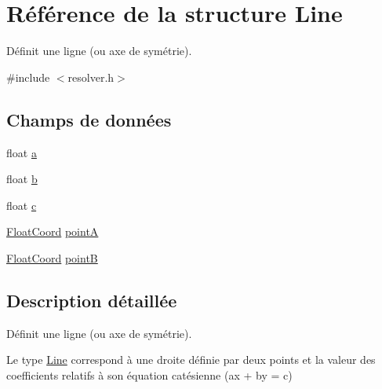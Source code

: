 \hypertarget{struct_line}{\section{Référence de la structure Line}
\label{struct_line}
}


Définit une ligne (ou axe de symétrie).  




{\ttfamily \#include $<$resolver.\-h$>$}

\subsection*{Champs de données}
\begin{DoxyCompactItemize}
\item 
float \hyperlink{struct_line_a4124bc0a9335c27f086f24ba207a4912}{a}
\item 
float \hyperlink{struct_line_a21ad0bd836b90d08f4cf640b4c298e7c}{b}
\item 
float \hyperlink{struct_line_ae0323a9039add2978bf5b49550572c7c}{c}
\item 
\hyperlink{struct_float_coord}{Float\-Coord} \hyperlink{struct_line_ae61338ee34dcba3435f5415e653cad2a}{point\-A}
\item 
\hyperlink{struct_float_coord}{Float\-Coord} \hyperlink{struct_line_ac573310eb7acf2d7e112153d00a92695}{point\-B}
\end{DoxyCompactItemize}


\subsection{Description détaillée}
Définit une ligne (ou axe de symétrie). 

Le type \hyperlink{struct_line}{Line} correspond à une droite définie par deux points et la valeur des coefficients relatifs à son équation catésienne (ax + by = c) 

